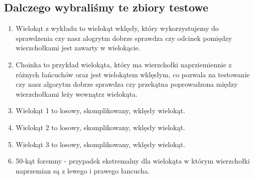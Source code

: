   \subsection{Dalczego wybraliśmy te zbiory testowe}
  \begin{enumerate}
    \item Wielokąt z wykładu to wielokąt wklęsły, który wykorzystujemy do sprawdzenia czy nasz alogrytm dobrze sprawdza czy odcinek pomiędzy wierzchołkami jest zawarty w wielokącie.
    \item Choinka to przykład wielokąta, który ma wierzchołki naprziemiennie z różnych łańcuchów oraz jest wielokątem wklęsłym, co pozwala na testowanie czy nasz algorytm dobrze sprawdza czy przekątna poprowadzona między wierzchołkami leży wewnątrz wielokąta.  
    \item Wielokąt 1 to losowy, skomplikowany, wklęsły wielokąt.
    \item Wielokąt 2 to losowy, skomplikowany, wklęsły wielokąt.
    \item Wielokąt 3 to losowy, skomplikowany, wklęsły wielokąt.
    \item 50-kąt foremny - przypadek ekstremalny dla wielokąta w którym wierzchołki naprzemian są z lewego i prawego łancucha.
  \end{enumerate}